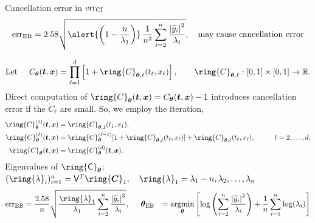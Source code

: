 \documentclass[handout, 10pt,compress,xcolor={usenames,dvipsnames}]{beamer} %
\newcommand{\bm}[1]{\boldsymbol{#1}}
\newcommand{\MLE}{\textup{EB}}
\newcommand{\CI}{\textup{CI}}
\newcommand{\vC}{\bvec{C}}
\newcommand{\rmC}{\ring{\mC}}
\newcommand{\err}{{\text{err}}}
\newcommand{\rlambda}{\ring{\lambda}}
\newcommand{\rC}{\ring{C}}
\newcommand{\rvC}{\ring{\vC}}
\renewcommand{\ty}{\widetilde{y}}
\renewcommand{\vtheta}{{\bm{\theta}}}
\newcommand{\pause}{}
\def\abs#1{\ensuremath{\left \lvert #1 \right \rvert}}
\begin{document}
\begin{frame}{Cancellation error in $\err_\CI$}
	\vspace{-7.5ex}
	\begin{align*}
	\err_\MLE =
	2.58\sqrt{\alert{\left( 1 - \frac{n}{\lambda_1} \right)} \,
		\frac {1}{n^2} \sum_{i=2}^{n} \frac{\abs{\ty_i}^2}{\lambda_i}  }
	,
	\quad \text{may cause cancellation error}
	\end{align*}
	\pause
	\vspace{-2ex}
	\begin{align*}
	\text{Let} \hspace{0.5cm} C_{\vtheta}(\vt, \vx) = \prod_{\ell=1}^d \left[1 + \rC_{\vtheta,\ell}(t_\ell,x_\ell) \right], \qquad  \rC_{\vtheta,\ell}:[0,1] \times [0,1] \to \reals.
	\end{align*}
	Direct computation of $\rC_{\vtheta} (\vt,\vx) = C_{\vtheta}(\vt,\vx) -1$ introduces cancellation error if the $ \rC_\ell$ are small.  So, we employ the iteration,
	\begin{align*}
	\rC_{\vtheta}^{(1)}(\vt,\vx) &= \rC_{\vtheta,1}(t_1,x_1),  \\
	\rC_{\vtheta}^{(\ell)}(\vt,\vx) &  = \rC_{\vtheta}^{(\ell-1)}[1 + \rC_{\vtheta,\ell}(t_\ell,x_\ell)] + \rC_{\vtheta,\ell}(t_\ell,x_\ell),  \hspace{1cm} \ell = 2, \ldots, d, \\
	\rC_{\vtheta}(\vt,\vx)  & = \rC_{\vtheta}^{(d)}(\vt,\vx).
	\end{align*}
	Eigenvalues of $\rmC_{\vtheta}$:  
	$(\rlambda_i)_{i=1}^n = \mV^T \rvC_1, \quad \rlambda_1 = \lambda_1 - n, \lambda_2, \ldots, \lambda_n$
	\begin{align*}
	\err_\MLE  &
	=
	\frac{2.58}{n}\sqrt{
		\frac{\rlambda_1}{\lambda_1}
		\sum_{i=2}^{n} \frac{\abs{\ty_i}^2}{\lambda_i}  
	}, 
	\hspace{0.5cm}
	\vtheta_\MLE
	&= 
	\argmin_{\vtheta}
	\left[
	\log\left(
	\sum_{i=2}^n \frac{\abs{\ty_i}^2}{\lambda_i}
	\right) 
	+ 
	\frac{1}{n}\sum_{i=1}^n \log(\lambda_i)
	\right]
	\end{align*}
	
\end{frame}
\end{document}
